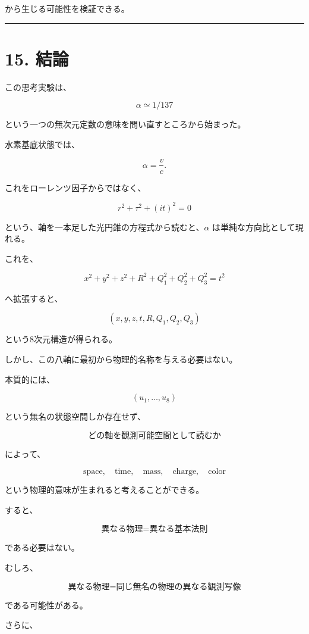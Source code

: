 \documentclass[
  a4paper,
]{ltjsarticle}
\begin{document}
から生じる可能性を検証できる。

\begin{center}\rule{0.5\linewidth}{0.5pt}\end{center}

\section{15. 結論}\label{ux7d50ux8ad6}

この思考実験は、

\[
\boxed{\alpha\simeq1/137}
\]

という一つの無次元定数の意味を問い直すところから始まった。

水素基底状態では、

\[
\alpha=\frac vc.
\]

これをローレンツ因子からではなく、

\[
r^2+\tau^2+(it)^2=0
\]

という、軸を一本足した光円錐の方程式から読むと、\(\alpha\)
は単純な方向比として現れる。

これを、

\[
x^2+y^2+z^2+R^2+Q_1^2+Q_2^2+Q_3^2
=
t^2
\]

へ拡張すると、

\[
(x,y,z,t,R,Q_1,Q_2,Q_3)
\]

という8次元構造が得られる。

しかし、この八軸に最初から物理的名称を与える必要はない。

本質的には、

\[
(u_1,\ldots,u_8)
\]

という無名の状態空間しか存在せず、

\[
\boxed{
\text{どの軸を観測可能空間として読むか}
}
\]

によって、

\[
\text{space},
\quad
\text{time},
\quad
\text{mass},
\quad
\text{charge},
\quad
\text{color}
\]

という物理的意味が生まれると考えることができる。

すると、

\[
\boxed{
\text{異なる物理}
=
\text{異なる基本法則}
}
\]

である必要はない。

むしろ、

\[
\boxed{
\text{異なる物理}
=
\text{同じ無名の物理の異なる観測写像}
}
\]

である可能性がある。

さらに、
\end{document}
